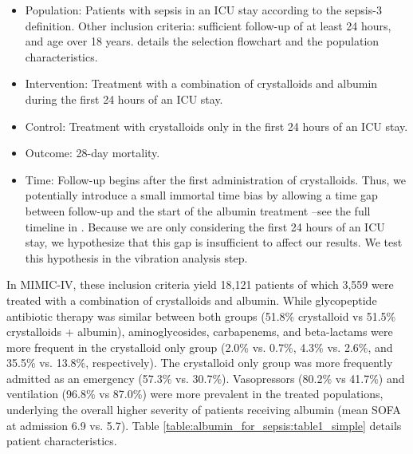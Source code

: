 \documentclass[10pt,letterpaper]{article}
\providecommand{\DIFaddtex}[1]{{\protect\color{blue}\uwave{#1}}} %
\providecommand{\DIFaddbegin}{} %
\providecommand{\DIFaddend}{} %
\providecommand{\DIFdelbegin}{} %
\providecommand{\DIFdelend}{} %
\providecommand{\DIFadd}[1]{\texorpdfstring{\DIFaddtex{#1}}{#1}} %
\newcommand{\DIFscaledelfig}{0.5}
\newlength{\DIFdelgraphicswidth} %
\newlength{\DIFdelgraphicsheight} %
\newcommand{\DIFaddincludegraphics}[2][]{{\color{blue}\fbox{\DIFOincludegraphics[#1]{#2}}}} %
\newcommand{\DIFdelincludegraphics}[2][]{%
\sbox{\DIFdelgraphicsbox}{\DIFOincludegraphics[#1]{#2}}%
\settoboxwidth{\DIFdelgraphicswidth}{\DIFdelgraphicsbox} %
\settoboxtotalheight{\DIFdelgraphicsheight}{\DIFdelgraphicsbox} %
\scalebox{\DIFscaledelfig}{%
\parbox[b]{\DIFdelgraphicswidth}{\usebox{\DIFdelgraphicsbox}\\[-\baselineskip] \rule{\DIFdelgraphicswidth}{0em}}\llap{\resizebox{\DIFdelgraphicswidth}{\DIFdelgraphicsheight}{%
\setlength{\unitlength}{\DIFdelgraphicswidth}%
\begin{picture}(1,1)%
\thicklines\linethickness{2pt} %
{\color[rgb]{1,0,0}\put(0,0){\framebox(1,1){}}}%
{\color[rgb]{1,0,0}\put(0,0){\line( 1,1){1}}}%
{\color[rgb]{1,0,0}\put(0,1){\line(1,-1){1}}}%
\end{picture}%
}\hspace*{3pt}}} %
} %
\DeclareRobustCommand{\DIFaddbegin}{\DIFOaddbegin \let\includegraphics\DIFaddincludegraphics} %
\DeclareRobustCommand{\DIFaddend}{\DIFOaddend \let\includegraphics\DIFOincludegraphics} %
\DeclareRobustCommand{\DIFdelbegin}{\DIFOdelbegin \let\includegraphics\DIFdelincludegraphics} %
\DeclareRobustCommand{\DIFdelend}{\DIFOaddend \let\includegraphics\DIFOincludegraphics} %
\begin{document}
\begin{itemize}[leftmargin=2ex]
  \item \textcolor{P}{Population}: Patients with sepsis in an ICU stay according
        to the sepsis-3 definition. Other inclusion criteria: sufficient
        follow-up of at least 24 hours, and age over 18 years.
        \DIFdelbegin %
        \DIFdelend \DIFaddbegin \DIFadd{S5 Fig }\DIFaddend details the selection flowchart and
        \DIFdelbegin %
        \DIFdelend \DIFaddbegin \DIFadd{S1 Table }\DIFaddend the population
        characteristics.

  \item \textcolor{I}{Intervention}: Treatment with a combination of
        crystalloids and albumin during the first 24 hours of an ICU stay.

  \item \textcolor{C}{Control}: Treatment with crystalloids only in the first 24
        hours of an ICU stay.

  \item \textcolor{O}{Outcome}: 28-day mortality.

  \item \textcolor{T}{Time}: Follow-up begins after the first administration of
        crystalloids. Thus, we potentially introduce a small immortal time bias
        by allowing a time gap between follow-up and the start of the albumin
        treatment --see the full timeline in \DIFdelbegin %
        \DIFdelend \DIFaddbegin \DIFadd{S3 Fig}\DIFaddend . Because
        we are only considering the first 24 hours of an ICU stay, we
        hypothesize that this gap is insufficient to affect our results. We test
        this hypothesis in the vibration analysis step.
\end{itemize}

In MIMIC-IV, these inclusion criteria yield 18,121 patients of which 3,559 were treated with a combination of crystalloids and albumin. While glycopeptide antibiotic therapy   was similar between both groups (51.8\% crystalloid vs 51.5\% crystalloids + albumin), aminoglycosides, carbapenems, and beta-lactams were more frequent in the crystalloid only group (2.0\% vs. 0.7\%, 4.3\% vs. 2.6\%, and 35.5\% vs. 13.8\%, respectively). The crystalloid only group was more frequently admitted as an emergency (57.3\% vs. 30.7\%). Vasopressors (80.2\% vs 41.7\%) and ventilation (96.8\% vs 87.0\%) were more prevalent in the treated populations, underlying the overall higher severity of patients receiving albumin (mean SOFA at admission 6.9 vs. 5.7).
Table \ref{table:albumin_for_sepsis:table1_simple} details
patient characteristics.
\end{document}
